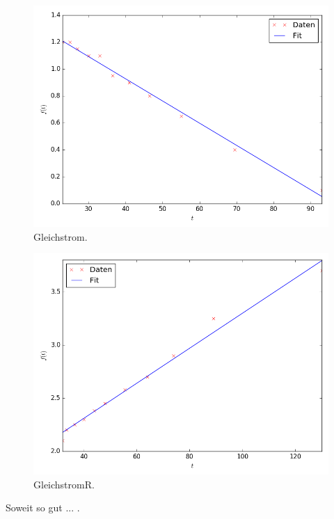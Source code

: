 \begin{figure}
	\centering
	\includegraphics[width=\linewidth,height=\textheight,keepaspectratio]{Gleichstrom.png}
	\caption{Gleichstrom.}
	\label{fig:Gleichstrom}
\end{figure}


\begin{figure}
	\centering
	\includegraphics[width=\linewidth,height=\textheight,keepaspectratio]{GleichstromR.png}
	\caption{GleichstromR.}
	\label{fig:GleichstromR}
\end{figure}


Soweit so gut ... .
 